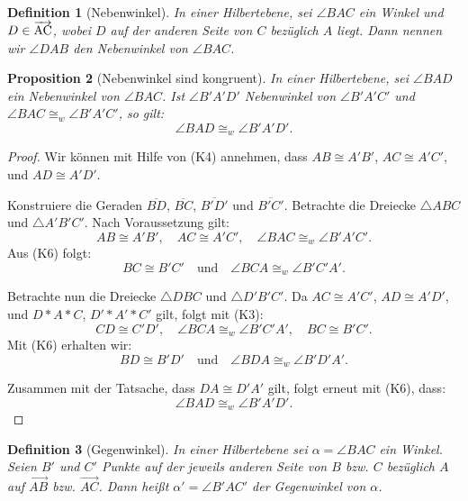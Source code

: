 \documentclass[a4paper,12pt]{article}
\theoremstyle{break}
\newtheorem{definition}{Definition}[section]
\newtheorem{proposition}[definition]{Proposition}
\begin{document}
\begin{definition}[Nebenwinkel]
\label{def:nebenwinkel}
In einer Hilbertebene, sei \(\angle BAC\) ein Winkel und \(D \in \overrightarrow{\rm AC}\), wobei \(D\) auf der anderen Seite von \(C\) bezüglich \(A\) liegt. Dann nennen wir \(\angle DAB\) den \emph{Nebenwinkel} von \(\angle BAC\).
\end{definition}

\begin{proposition}[Nebenwinkel sind kongruent]\label{prop:nebenwinkel_kongruent}
In einer Hilbertebene, sei \(\angle BAD\) ein Nebenwinkel von \(\angle BAC\). Ist \(\angle B'A'D'\) Nebenwinkel von \(\angle B'A'C'\) und \(\angle BAC \cong_w \angle B'A'C'\), so gilt:
\[
\angle BAD \cong_w \angle B'A'D'.
\]
\end{proposition}

\begin{proof}
Wir können mit Hilfe von (K4) annehmen, dass \(AB \cong A'B'\), \(AC \cong A'C'\), und \(AD \cong A'D'\). 

Konstruiere die Geraden \(\overline{BD}\), \(\overline{BC}\), \(\overline{B'D'}\) und \(\overline{B'C'}\). Betrachte die Dreiecke \(\triangle ABC\) und \(\triangle A'B'C'\). Nach Voraussetzung gilt:
\[
AB \cong A'B', \quad AC \cong A'C', \quad \angle BAC \cong_w \angle B'A'C'.
\]
Aus (K6) folgt:
\[
BC \cong B'C' \quad \text{und} \quad \angle BCA \cong_w \angle B'C'A'.
\]

Betrachte nun die Dreiecke \(\triangle DBC\) und \(\triangle D'B'C'\). Da \(AC \cong A'C'\), \(AD \cong A'D'\), und \(D * A * C\), \(D' * A' * C'\) gilt, folgt mit (K3):
\[
CD \cong C'D', \quad \angle BCA \cong_w \angle B'C'A', \quad BC \cong B'C'.
\]
Mit (K6) erhalten wir:
\[
BD \cong B'D' \quad \text{und} \quad \angle BDA \cong_w \angle B'D'A'.
\]

Zusammen mit der Tatsache, dass \(DA \cong D'A'\) gilt, folgt erneut mit (K6), dass:
\[
\angle BAD \cong_w \angle B'A'D'.
\]
\end{proof}

\begin{definition}[Gegenwinkel]
\label{def:gegenwinkel}
In einer Hilbertebene sei \(\alpha = \angle BAC\) ein Winkel. Seien \(B'\) und \(C'\) Punkte auf der jeweils anderen Seite von \(B\) bzw. \(C\) bezüglich \(A\) auf \(\overrightarrow{AB}\) bzw. \(\overrightarrow{AC}\). Dann heißt \(\alpha' = \angle B'AC'\) der \emph{Gegenwinkel} von \(\alpha\).
\end{definition}
\end{document}
